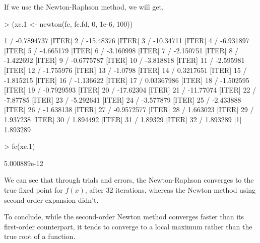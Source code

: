 \documentclass{article}
\begin{document}
\begin{enumerate}[(a)]
    If we use the Newton-Raphson method, we will get,
\begin{Schunk}
\begin{Sinput}
> (xc.1 <- newton(fc, fc.fd, 0, 1e-6, 100))
\end{Sinput}
\begin{Soutput}
[ITER] 1 / -0.7894737
[ITER] 2 / -15.48376
[ITER] 3 / -10.34711
[ITER] 4 / -6.931897
[ITER] 5 / -4.665179
[ITER] 6 / -3.160998
[ITER] 7 / -2.150751
[ITER] 8 / -1.422692
[ITER] 9 / -0.6775787
[ITER] 10 / -3.818818
[ITER] 11 / -2.595981
[ITER] 12 / -1.755976
[ITER] 13 / -1.0798
[ITER] 14 / 0.3217651
[ITER] 15 / -1.815215
[ITER] 16 / -1.136622
[ITER] 17 / 0.03367986
[ITER] 18 / -1.502595
[ITER] 19 / -0.7929593
[ITER] 20 / -17.62304
[ITER] 21 / -11.77074
[ITER] 22 / -7.87785
[ITER] 23 / -5.292641
[ITER] 24 / -3.577879
[ITER] 25 / -2.433888
[ITER] 26 / -1.638138
[ITER] 27 / -0.9572577
[ITER] 28 / 1.663023
[ITER] 29 / 1.937238
[ITER] 30 / 1.894492
[ITER] 31 / 1.89329
[ITER] 32 / 1.893289
[1] 1.893289
\end{Soutput}
\begin{Sinput}
> fc(xc.1)
\end{Sinput}
\begin{Soutput}
[1] 5.000889e-12
\end{Soutput}
\end{Schunk}
    We can see that through trials and errors, the Newton-Raphson converges to the true fixed point for $f(x)$, after 32 iterations, whereas the Newton method using second-order expansion didn't.

    To conclude, while the second-order Newton method converges faster than its first-order counterpart, it tends to converge to a local maximum rather than the true root of a function.


\end{enumerate}
\end{document}
